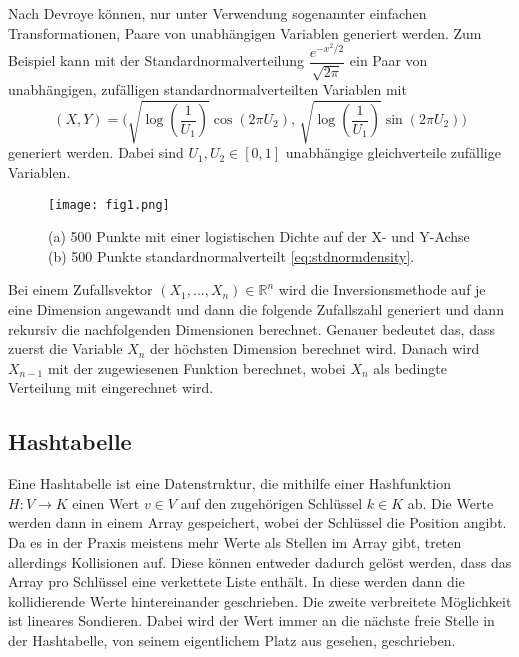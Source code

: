 Nach Devroye können, nur unter Verwendung sogenannter \glqq einfachen Transformationen\grqq, Paare von unabhängigen 
Variablen generiert werden. Zum Beispiel kann mit der Standardnormalverteilung $\dfrac{e^{-x^2/2}}{\sqrt{2\pi}}$ ein Paar von 
unabhängigen, zufälligen standardnormalverteilten Variablen mit 
\begin{equation}
    (X, Y) = \bigg( \sqrt{\log(\dfrac{1}{U_1})}\cos(2\pi U_2),\, \sqrt{\log(\dfrac{1}{U_1})}\sin(2\pi U_2) \bigg)
    \label{eq:stdnormdensity}
\end{equation}
generiert werden. Dabei sind $U_1, U_2 \in [0, 1]$ unabhängige gleichverteile zufällige Variablen.

\begin{figure}
    \centering
    \texttt{[image: fig1.png]}
    \caption{(a) 500 Punkte mit einer logistischen Dichte auf der X- und Y-Achse (b) 500 Punkte standardnormalverteilt \eqref{eq:stdnormdensity}.}
    \label{bild:examplePlot}
\end{figure}


Bei einem Zufallsvektor $ (X_1, ..., X_n) \in \mathbb{R}^n$ wird die Inversionsmethode auf je eine Dimension angewandt 
und dann die folgende Zufallszahl generiert und dann rekursiv die nachfolgenden Dimensionen berechnet. Genauer bedeutet das, 
dass zuerst die Variable $X_n$ der höchsten Dimension berechnet wird. Danach wird $X_{n-1}$ mit der zugewiesenen Funktion 
berechnet, wobei $X_n$ als bedingte Verteilung mit eingerechnet wird.


\subsection{Hashtabelle}
Eine Hashtabelle ist eine Datenstruktur, die mithilfe einer Hashfunktion $H: V \rightarrow K$ einen Wert $v \in V$ 
auf den zugehörigen Schlüssel $k \in K$ ab. Die Werte werden dann in einem Array gespeichert, 
wobei der Schlüssel die Position angibt. Da es in der Praxis meistens mehr Werte als Stellen im Array gibt, treten 
allerdings Kollisionen auf. Diese können entweder dadurch gelöst werden, dass das Array pro Schlüssel eine verkettete 
Liste enthält. In diese werden dann die kollidierende Werte hintereinander geschrieben. Die zweite verbreitete Möglichkeit 
ist lineares Sondieren. Dabei wird der Wert immer an die nächste freie Stelle in der Hashtabelle, von seinem eigentlichem 
Platz aus gesehen, geschrieben.


